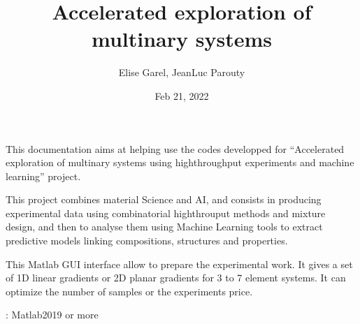 \documentclass[letterpaper,10pt,english]{sphinxmanual}
\title{Accelerated exploration of multinary systems}
\date{Feb 21, 2022}
\author{Elise Garel, Jean\sphinxhyphen{}Luc Parouty}
\begin{document}
\pagestyle{empty}
\sphinxmaketitle
\pagestyle{plain}
\sphinxtableofcontents
\pagestyle{normal}
\label{\detokenize{index::doc}}


\sphinxAtStartPar
This documentation aims at helping use the codes developped for “Accelerated exploration of multinary systems using high\sphinxhyphen{}throughput experiments and machine learning” project.

\sphinxAtStartPar
This project combines material Science and AI, and consists in producing experimental data using combinatorial high\sphinxhyphen{}throuput methods and mixture design, and then to analyse them using Machine Learning tools to extract predictive models linking compositions, structures and properties.

\sphinxAtStartPar
{}

\sphinxAtStartPar
This Matlab GUI interface allow to prepare the experimental work. It gives a set of 1D linear gradients or 2D planar gradients for 3 to 7 element systems. It can optimize the number of samples or the experiments price.

\sphinxAtStartPar
{}: Matlab2019 or more

\sphinxAtStartPar
{}
\end{document}
